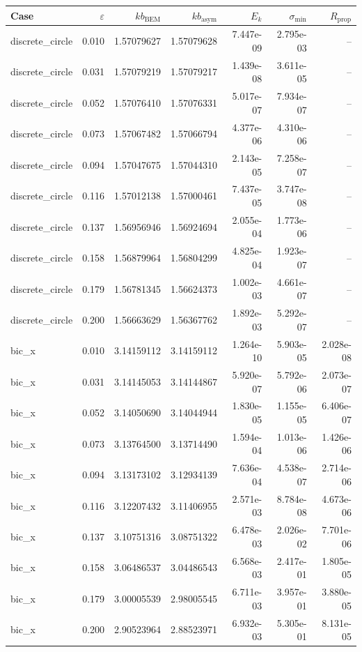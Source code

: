 \begin{tabular}{lrrrrrr}
\hline
Case & $\varepsilon$ & $kb_{\mathrm{BEM}}$ & $kb_{\mathrm{asym}}$ & $E_k$ & $\sigma_{\min}$ & $R_{\mathrm{prop}}$ \\
\hline
discrete_circle & 0.010 & 1.57079627 & 1.57079628 & 7.447e-09 & 2.795e-03 & -- \\
discrete_circle & 0.031 & 1.57079219 & 1.57079217 & 1.439e-08 & 3.611e-05 & -- \\
discrete_circle & 0.052 & 1.57076410 & 1.57076331 & 5.017e-07 & 7.934e-07 & -- \\
discrete_circle & 0.073 & 1.57067482 & 1.57066794 & 4.377e-06 & 4.310e-06 & -- \\
discrete_circle & 0.094 & 1.57047675 & 1.57044310 & 2.143e-05 & 7.258e-07 & -- \\
discrete_circle & 0.116 & 1.57012138 & 1.57000461 & 7.437e-05 & 3.747e-08 & -- \\
discrete_circle & 0.137 & 1.56956946 & 1.56924694 & 2.055e-04 & 1.773e-06 & -- \\
discrete_circle & 0.158 & 1.56879964 & 1.56804299 & 4.825e-04 & 1.923e-07 & -- \\
discrete_circle & 0.179 & 1.56781345 & 1.56624373 & 1.002e-03 & 4.661e-07 & -- \\
discrete_circle & 0.200 & 1.56663629 & 1.56367762 & 1.892e-03 & 5.292e-07 & -- \\
bic_x & 0.010 & 3.14159112 & 3.14159112 & 1.264e-10 & 5.903e-05 & 2.028e-08 \\
bic_x & 0.031 & 3.14145053 & 3.14144867 & 5.920e-07 & 5.792e-06 & 2.073e-07 \\
bic_x & 0.052 & 3.14050690 & 3.14044944 & 1.830e-05 & 1.155e-05 & 6.406e-07 \\
bic_x & 0.073 & 3.13764500 & 3.13714490 & 1.594e-04 & 1.013e-06 & 1.426e-06 \\
bic_x & 0.094 & 3.13173102 & 3.12934139 & 7.636e-04 & 4.538e-07 & 2.714e-06 \\
bic_x & 0.116 & 3.12207432 & 3.11406955 & 2.571e-03 & 8.784e-08 & 4.673e-06 \\
bic_x & 0.137 & 3.10751316 & 3.08751322 & 6.478e-03 & 2.026e-02 & 7.701e-06 \\
bic_x & 0.158 & 3.06486537 & 3.04486543 & 6.568e-03 & 2.417e-01 & 1.805e-05 \\
bic_x & 0.179 & 3.00005539 & 2.98005545 & 6.711e-03 & 3.957e-01 & 3.880e-05 \\
bic_x & 0.200 & 2.90523964 & 2.88523971 & 6.932e-03 & 5.305e-01 & 8.131e-05 \\

\end{tabular}

